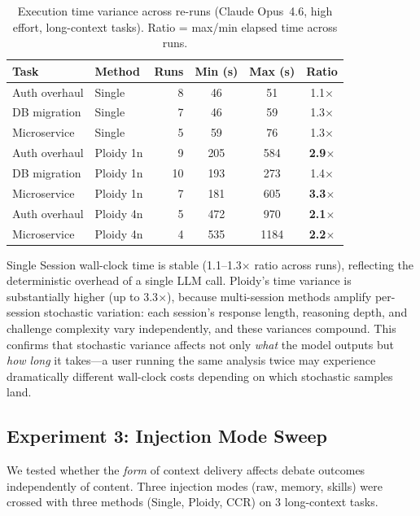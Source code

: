\documentclass[11pt]{article}
\begin{document}
\begin{table}[H]
\centering
\caption{Execution time variance across re-runs (Claude Opus~4.6, high effort, long-context tasks). Ratio = max/min elapsed time across runs.}
\label{tab:time-variance}
\small
\begin{tabular}{@{}llrccc@{}}
\toprule
\textbf{Task} & \textbf{Method} & \textbf{Runs} & \textbf{Min (s)} & \textbf{Max (s)} & \textbf{Ratio} \\
\midrule
Auth overhaul    & Single    & 8  & 46   & 51   & 1.1$\times$ \\
DB migration     & Single    & 7  & 46   & 59   & 1.3$\times$ \\
Microservice     & Single    & 5  & 59   & 76   & 1.3$\times$ \\
\midrule
Auth overhaul    & Ploidy 1n & 9  & 205  & 584  & \textbf{2.9$\times$} \\
DB migration     & Ploidy 1n & 10 & 193  & 273  & 1.4$\times$ \\
Microservice     & Ploidy 1n & 7  & 181  & 605  & \textbf{3.3$\times$} \\
\midrule
Auth overhaul    & Ploidy 4n & 5  & 472  & 970  & \textbf{2.1$\times$} \\
Microservice     & Ploidy 4n & 4  & 535  & 1184 & \textbf{2.2$\times$} \\
\bottomrule
\end{tabular}
\end{table}

Single Session wall-clock time is stable (1.1--1.3$\times$ ratio across runs), reflecting the deterministic overhead of a single LLM call. Ploidy's time variance is substantially higher (up to 3.3$\times$), because multi-session methods amplify per-session stochastic variation: each session's response length, reasoning depth, and challenge complexity vary independently, and these variances compound. This confirms that stochastic variance affects not only \emph{what} the model outputs but \emph{how long} it takes---a user running the same analysis twice may experience dramatically different wall-clock costs depending on which stochastic samples land.

\subsection{Experiment 3: Injection Mode Sweep}
\label{sec:injection-sweep}

We tested whether the \emph{form} of context delivery affects debate outcomes independently of content. Three injection modes (raw, memory, skills) were crossed with three methods (Single, Ploidy, CCR) on 3 long-context tasks.
\end{document}
